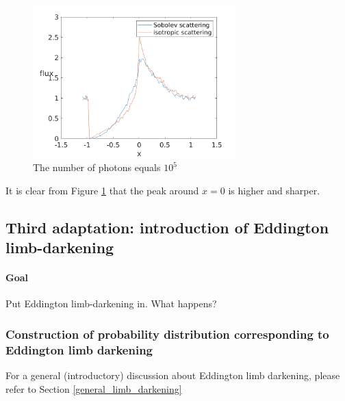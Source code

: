 \documentclass[../main/main.tex]{subfiles}
\begin{document}
\begin{figure}[!htbp]
\centering
\includegraphics[width=0.7\textwidth]{../../introductory_exercises/P_Cygni_profile_UV_resonance/data/compare_isotropic_scattering_xk0100.png}
\caption{The number of photons equals $10^{5}$}
\label{Pcyg_isotropic_scattering}
\end{figure}

It is clear from Figure \ref{Pcyg_isotropic_scattering} that the peak around $x=0$ is higher and sharper. \\
\noindent{}

\newpage
\subsection{Third adaptation: introduction of Eddington limb-darkening}
\label{Eddington_limb_darkening_adaptation}

\paragraph{Goal} Put Eddington limb-darkening in. What happens? 

\subsubsection{Construction of probability distribution corresponding to Eddington limb darkening}
For a general (introductory) discussion about Eddington limb darkening, please refer to Section \ref{general_limb_darkening}
\end{document}
